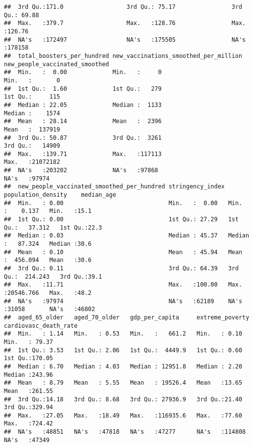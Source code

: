 \documentclass[
]{article}
\begin{document}
\begin{verbatim}
##  3rd Qu.:171.0                  3rd Qu.: 75.17                3rd Qu.: 69.88                     
##  Max.   :379.7                  Max.   :128.76                Max.   :126.76                     
##  NA's   :172497                 NA's   :175505                NA's   :178158                     
##  total_boosters_per_hundred new_vaccinations_smoothed_per_million new_people_vaccinated_smoothed
##  Min.   :  0.00             Min.   :     0                        Min.   :       0              
##  1st Qu.:  1.60             1st Qu.:   279                        1st Qu.:     115              
##  Median : 22.05             Median :  1133                        Median :    1574              
##  Mean   : 28.14             Mean   :  2396                        Mean   :  137919              
##  3rd Qu.: 50.87             3rd Qu.:  3261                        3rd Qu.:   14909              
##  Max.   :139.71             Max.   :117113                        Max.   :21072182              
##  NA's   :203202             NA's   :97868                         NA's   :97974                 
##  new_people_vaccinated_smoothed_per_hundred stringency_index population_density    median_age   
##  Min.   : 0.00                              Min.   :  0.00   Min.   :    0.137   Min.   :15.1   
##  1st Qu.: 0.00                              1st Qu.: 27.29   1st Qu.:   37.312   1st Qu.:22.3   
##  Median : 0.03                              Median : 45.37   Median :   87.324   Median :30.6   
##  Mean   : 0.10                              Mean   : 45.94   Mean   :  456.094   Mean   :30.6   
##  3rd Qu.: 0.11                              3rd Qu.: 64.39   3rd Qu.:  214.243   3rd Qu.:39.1   
##  Max.   :11.71                              Max.   :100.00   Max.   :20546.766   Max.   :48.2   
##  NA's   :97974                              NA's   :62189    NA's   :31058       NA's   :46802  
##  aged_65_older   aged_70_older   gdp_per_capita     extreme_poverty  cardiovasc_death_rate
##  Min.   : 1.14   Min.   : 0.53   Min.   :   661.2   Min.   : 0.10    Min.   : 79.37       
##  1st Qu.: 3.53   1st Qu.: 2.06   1st Qu.:  4449.9   1st Qu.: 0.60    1st Qu.:170.05       
##  Median : 6.70   Median : 4.03   Median : 12951.8   Median : 2.20    Median :243.96       
##  Mean   : 8.79   Mean   : 5.55   Mean   : 19526.4   Mean   :13.65    Mean   :261.55       
##  3rd Qu.:14.18   3rd Qu.: 8.68   3rd Qu.: 27936.9   3rd Qu.:21.40    3rd Qu.:329.94       
##  Max.   :27.05   Max.   :18.49   Max.   :116935.6   Max.   :77.60    Max.   :724.42       
##  NA's   :48851   NA's   :47818   NA's   :47277      NA's   :114808   NA's   :47349        

\end{verbatim}
\end{document}
